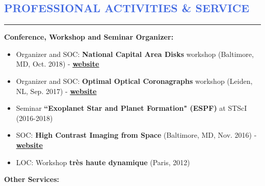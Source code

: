 \documentclass[11pt]{article}
\begin{document}
\vspace{-0.35cm}
\textcolor{RoyalBlue}{\section{\large PROFESSIONAL ACTIVITIES \& SERVICE}
\vspace{-0.35cm}\hrule}
\vspace{0.4cm}

\textbf{Conference, Workshop and Seminar Organizer:}
\vspace{0.3cm}
\begin{itemize} \itemsep -2pt
 \item \small Organizer and SOC: \textbf{National Capital Area Disks} workshop (Baltimore, MD, Oct. 2018) - \href{https://sites.google.com/view/ncad7-at-jhu/ncad7}{\underline{\textbf{website}}}
 \item \small Organizer and SOC: \textbf{Optimal Optical Coronagraphs} workshop (Leiden, NL, Sep. 2017) - \href{https://www.lorentzcenter.nl/lc/web/2017/924/info.php3?wsid=924&venue=Snellius}{\underline{\textbf{website}}}
 \item \small Seminar \textbf{``Exoplanet Star and Planet Formation" (ESPF)} at STScI (2016-2018)
 \item \small SOC: \textbf{High Contrast Imaging from Space} (Baltimore, MD, Nov. 2016) - \href{http://www.cvent.com/events/high-contrast-imaging-in-space-workshop/event-summary-eb3bb6bd54a342c5a15678daa49be683.aspx}{\underline{\textbf{website}}}
 \item \small LOC: Workshop \textbf{très haute dynamique} (Paris, 2012)
\end{itemize}
\vspace{0.1cm}
\textbf{Other Services:}
\end{document}
